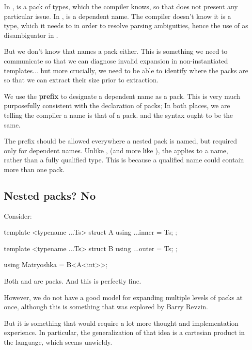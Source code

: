 \documentclass{wg21}
\begin{document}
In ,  is a pack of types, which the compiler knows, so that does not present any particular issue.
In ,  is a dependent name. The compiler doesn't know it is a type, which it needs to in order to resolve parsing ambiguities,
hence the use of  as disambiguator in .

But we don't know that  names a pack either.
This is something we need to communicate so that we can diagnose invalid expansion in non-instantiated templates...
but more crucially, we need to be able to identify where the packs are so that we can extract their size prior to extraction.

We use the  \textbf{prefix} to designate a dependent name as a pack.
This is very much purposefully consistent with the declaration of packs; In both places, we are telling the compiler a name is that of a pack.
and the syntax ought to be the same.

The  prefix should be allowed everywhere a nested pack is named, but required only for dependent names.
Unlike , (and more like ), the  applies to a name, rather than a fully qualified type.
This is because a qualified name could contain more than one pack.

\subsection{Nested packs? No}

Consider:

\begin{colorblock}
template <typename ...Ts>
struct A {
    using ...inner = Ts;
};

template <typename ...Ts>
struct B {
    using ...outer = Ts;
};

using Matryoshka = B<A<int>>;

\end{colorblock}

Both  and  are packs.
And this is perfectly fine.

However, we do not have a good model for expanding multiple levels of packs at once,
although this is something that was explored by Barry Revzin.

But it is something that would require a lot more thought and implementation experience.
In particular, the generalization of that idea is a cartesian product in the language,
which seems unwieldy.
\end{document}
